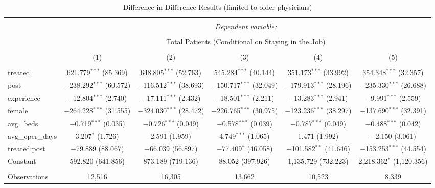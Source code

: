 
\begin{table}[!htbp] \centering 
  \caption{Difference in Difference Results (limited to older physicians)} 
  \label{} 
\small 
\begin{tabular}{@{\extracolsep{3pt}}lccccc} 
\\[-1.8ex]\hline 
\hline \\[-1.8ex] 
 & \multicolumn{5}{c}{\textit{Dependent variable:}} \\ 
\cline{2-6} 
\\[-1.8ex] & \multicolumn{5}{c}{Total Patients (Conditional on Staying in the Job)} \\ 
\\[-1.8ex] & (1) & (2) & (3) & (4) & (5)\\ 
\hline \\[-1.8ex] 
 treated & 621.779$^{***}$ (85.369) & 648.805$^{***}$ (52.763) & 545.284$^{***}$ (40.144) & 351.173$^{***}$ (33.992) & 354.348$^{***}$ (32.357) \\ 
  post & $-$238.292$^{***}$ (60.572) & $-$116.512$^{***}$ (38.693) & $-$150.717$^{***}$ (32.049) & $-$179.913$^{***}$ (28.196) & $-$235.330$^{***}$ (26.688) \\ 
  experience & $-$12.804$^{***}$ (2.740) & $-$17.111$^{***}$ (2.432) & $-$18.501$^{***}$ (2.211) & $-$13.283$^{***}$ (2.941) & $-$9.991$^{***}$ (2.559) \\ 
  female & $-$264.228$^{***}$ (31.555) & $-$324.030$^{***}$ (28.472) & $-$226.765$^{***}$ (30.975) & $-$123.236$^{***}$ (38.297) & $-$137.690$^{***}$ (32.391) \\ 
  avg\_beds & $-$0.719$^{***}$ (0.035) & $-$0.726$^{***}$ (0.049) & $-$0.578$^{***}$ (0.039) & $-$0.787$^{***}$ (0.049) & $-$0.488$^{***}$ (0.042) \\ 
  avg\_oper\_days & 3.207$^{*}$ (1.726) & 2.591 (1.959) & 4.749$^{***}$ (1.065) & 1.471 (1.992) & $-$2.150 (3.061) \\ 
  treated:post & $-$79.889 (88.067) & $-$66.039 (56.897) & $-$77.409$^{*}$ (46.058) & $-$101.582$^{**}$ (41.646) & $-$153.253$^{***}$ (44.554) \\ 
  Constant & 592.820 (641.856) & 873.189 (719.136) & 88.052 (397.926) & 1,135.729 (732.223) & 2,218.362$^{*}$ (1,120.356) \\ 
 \hline \\[-1.8ex] 
Observations & 12,516 & 16,305 & 13,662 & 10,523 & 8,339 \\ 

\end{tabular}
\end{table}
